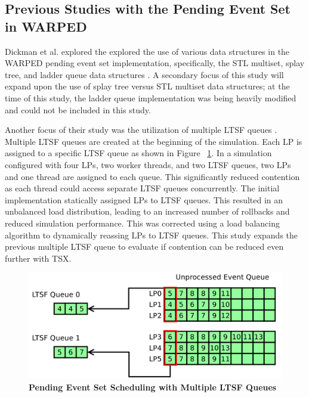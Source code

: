 \documentclass[a4paper]{article}
\begin{document}
\subsection{\textbf{Previous Studies with the Pending Event Set in WARPED}}

Dickman et al. explored the explored the use of various data structures in the
WARPED pending event set implementation, specifically, the STL multiset, splay
tree, and ladder queue data structures \cite{dickman}.  A secondary focus of
this study will expand upon the use of splay tree versus STL multiset data
structures; at the time of this study, the ladder queue implementation was being
heavily modified and could not be included in this study.
\par

Another focus of their study was the utilization of multiple LTSF queues
\cite{dickman}.  Multiple LTSF queues are created at the beginning of the
simulation.  Each LP is assigned to a specific LTSF queue as shown in Figure
~\ref{fig:multipleLTSF}.  In a simulation configured with four LPs, two worker
threads, and two LTSF queues, two LPs and one thread are assigned to each queue.
This significantly reduced contention as each thread could access separate LTSF
queues concurrently.  The initial implementation statically assigned LPs to LTSF
queues.  This resulted in an unbalanced load distribution, leading to an
increased number of rollbacks and reduced simulation performance.  This was
corrected using a load balancing algorithm to dynamically reassing LPs to LTSF
queues.  This study expands the previous multiple LTSF queue to evaluate if
contention can be reduced even further with TSX.
\par


\begin{figure}[H]
    \centering
    \graphicspath{ {./figures/} }
    \includegraphics[width=\textwidth,height=\textheight,keepaspectratio]{multiple_ltsf}
    \caption{\textbf{Pending Event Set Scheduling with Multiple LTSF Queues}}
    \label{fig:multipleLTSF}
\end{figure}
\end{document}
